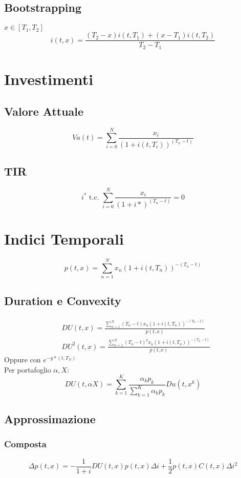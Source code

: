 \documentclass[a4paper,notitlepage]{report}%
\begin{document}
\begin{multicols*}{2}
    \subsection*{Bootstrapping}
    $x\in [T_1,T_2]$
    \[ 
        i(t,x)=\frac{(T_2-x)i(t,T_1)+(x-T_1)i(t,T_2)}{T_2-T_1}
    \]

\section*{Investimenti}

    \subsection*{Valore Attuale}
    \[ 
        Va(t)=\sum_{i=0}^N \frac{x_i}{(1+i(t,T_i))^{(T_n-t)}}
    \]

    \subsection*{TIR}
    \[
        i^* \text{ t.c. } \sum_{i=0}^N \frac{x_i}{(1+i*)^{(T_n-t)}} = 0
    \]

\section*{Indici Temporali}

    \[
        p(t,x)=\sum_{n=1}^N x_n(1+i(t,T_n))^{-(T_n-t)}    
    \]

    \subsection*{Duration e Convexity}
    \begin{align*}
        &DU(t,x)=\frac{\sum_{n=1}^N (T_n-t) x_n (1+i(t,T_n))^{-(T_n-t)} }{p(t,x)} \\
        &DU^2(t,x)=\frac{\sum_{n=1}^N (T_n-t)^2 x_n (1+i(t,T_n))^{-(T_n-t)} }{p(t,x)}
    \end{align*}
    Oppure con $e^{-y*(t,T_N)}$\\
    Per portafoglio $\alpha,X$:
    \[
        DU(t,\alpha X) = \sum_{k=1}^K \frac{\alpha_k p_k}{\sum_{k=1}^K \alpha_k p_k} Du(t,x^k)
    \]

    \subsection*{Approssimazione}

        \subsubsection*{Composta}
        \[
            \Delta p(t,x) = -\frac{1}{1+i} DU(t,x) p(t,x) \Delta i + \frac{1}{2} p(t,x) C(t,x) \Delta i^2
        \]


\end{multicols*}
\end{document}
